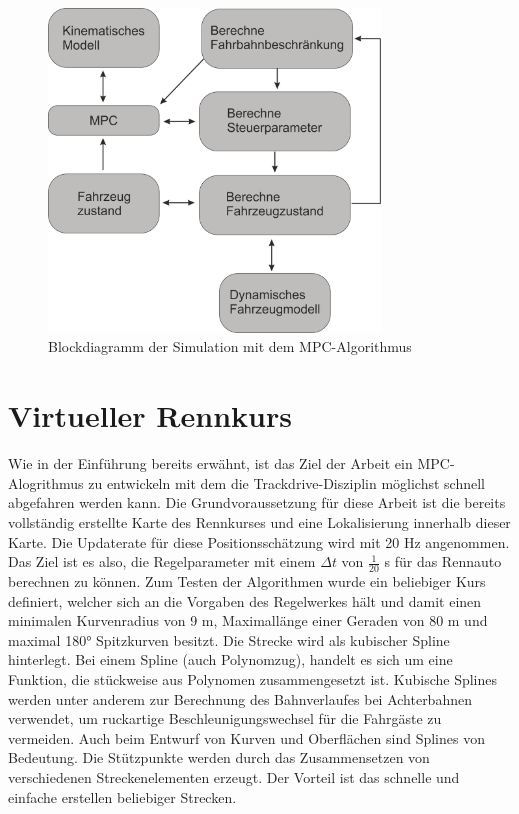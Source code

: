 \documentclass{like}
\begin{document}
\begin{figure}[ht!]
	\centering
	\includegraphics[width=250pt]{Abbildungen/MPCSimulation.png}
	\caption{Blockdiagramm der Simulation mit dem \ac{MPC}-Algorithmus}
	\label{fig:block_diagram_sim}
\end{figure}


\section{Virtueller Rennkurs}
Wie in der Einführung bereits erwähnt, ist das Ziel der Arbeit ein \ac{MPC}-Alogrithmus zu entwickeln mit dem die Trackdrive-Disziplin möglichst schnell abgefahren werden kann. Die Grundvoraussetzung für diese Arbeit ist die bereits vollständig erstellte Karte des Rennkurses und eine Lokalisierung innerhalb dieser Karte. Die Updaterate für diese Positionsschätzung wird mit 20 Hz angenommen. Das Ziel ist es also, die Regelparameter mit einem $\Delta t$ von $\frac{1}{20}$ s für das Rennauto berechnen zu können.  Zum Testen der Algorithmen wurde ein beliebiger Kurs definiert, welcher sich an die Vorgaben des Regelwerkes hält und damit einen minimalen Kurvenradius von 9 m, Maximallänge einer Geraden von 80 m und maximal 180° Spitzkurven besitzt. Die Strecke wird als kubischer Spline hinterlegt. Bei einem Spline (auch Polynomzug), handelt es sich um eine Funktion, die stückweise aus Polynomen zusammengesetzt ist. Kubische Splines werden unter anderem zur Berechnung des Bahnverlaufes bei Achterbahnen verwendet, um ruckartige Beschleunigungswechsel für die Fahrgäste zu vermeiden. Auch beim Entwurf von Kurven und Oberflächen sind Splines von Bedeutung. Die Stützpunkte werden durch das Zusammensetzen von verschiedenen Streckenelementen erzeugt. Der Vorteil ist das schnelle und einfache erstellen beliebiger Strecken. 
\end{document}
